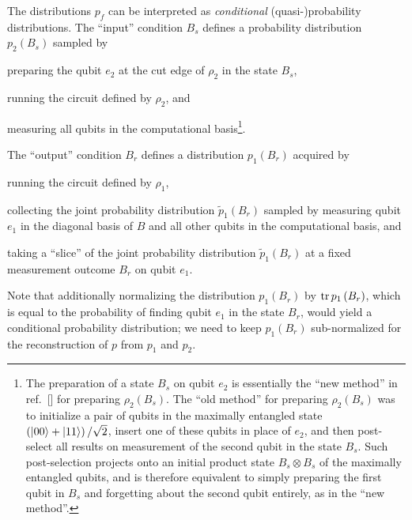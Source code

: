 \documentclass[nofootinbib,notitlepage,11pt]{revtex4-2}
\newcommand{\p}[1]{\left(#1\right)} %
\begin{document}
The distributions $p_f$ can be interpreted as {\it conditional}
\mbox{(quasi-)probability} distributions.  The ``input'' condition
$B_s$ defines a probability distribution $p_2\p{B_s}$ sampled by
\begin{enumerate*}
\item preparing the qubit $e_2$ at the cut edge of $\rho_2$ in the
  state $B_s$,
\item running the circuit defined by $\rho_2$, and
\item measuring all qubits in the computational basis\footnote{The
    preparation of a state $B_s$ on qubit $e_2$ is essentially the
    ``new method'' in ref.~[] for
    preparing $\rho_2\p{B_s}$.  The ``old method'' for preparing
    $\rho_2\p{B_s}$ was to initialize a pair of qubits in the
    maximally entangled state $\p{\ket{00}+\ket{11}}/\sqrt2$, insert
    one of these qubits in place of $e_2$, and then post-select all
    results on measurement of the second qubit in the state $B_s$.
    Such post-selection projects onto an initial product state
    $B_s\otimes B_s$ of the maximally entangled qubits, and is
    therefore equivalent to simply preparing the first qubit in $B_s$
    and forgetting about the second qubit entirely, as in the ``new
    method''.}.
\end{enumerate*}
The ``output'' condition $B_r$ defines a distribution $p_1\p{B_r}$
acquired by
\begin{enumerate*}
\item running the circuit defined by $\rho_1$,
\item collecting the joint probability distribution
  $\tilde p_1\p{B_r}$ sampled by measuring qubit $e_1$ in the diagonal
  basis of $B$ and all other qubits in the computational basis, and
\item taking a ``slice'' of the joint probability distribution
  $\tilde p_1\p{B_r}$ at a fixed measurement outcome $B_r$ on qubit
  $e_1$.
\end{enumerate*}
Note that additionally normalizing the distribution $p_1\p{B_r}$ by
$\tr p_1\p{B_r}$, which is equal to the probability of finding qubit
$e_1$ in the state $B_r$, would yield a conditional probability
distribution; we need to keep $p_1\p{B_r}$ sub-normalized for the
reconstruction of $p$ from $p_1$ and $p_2$.
\end{document}
